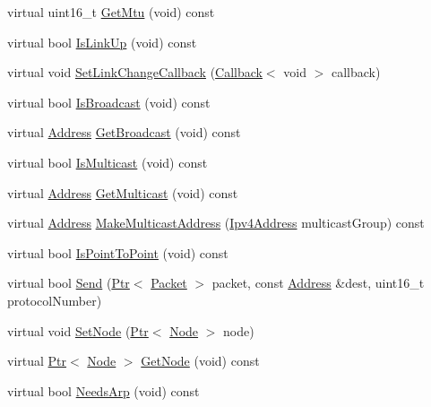 \begin{DoxyCompactItemize}
\item 
virtual uint16\+\_\+t \hyperlink{classns3_1_1WimaxNetDevice_ad847fc199e9517a7d34f5b012bb37cca}{Get\+Mtu} (void) const 
\item 
virtual bool \hyperlink{classns3_1_1WimaxNetDevice_a7d162542e86e757bd41593b82fe189cd}{Is\+Link\+Up} (void) const 
\item 
virtual void \hyperlink{classns3_1_1WimaxNetDevice_a7902e71d1f2c4e8c1f0f86f5bd6730e7}{Set\+Link\+Change\+Callback} (\hyperlink{classns3_1_1Callback}{Callback}$<$ void $>$ callback)
\item 
virtual bool \hyperlink{classns3_1_1WimaxNetDevice_a2719e45018c84b51577e6b17e57d46ad}{Is\+Broadcast} (void) const 
\item 
virtual \hyperlink{classns3_1_1Address}{Address} \hyperlink{classns3_1_1WimaxNetDevice_a2fde0a0f5aaceebdaeb3934331db94aa}{Get\+Broadcast} (void) const 
\item 
virtual bool \hyperlink{classns3_1_1WimaxNetDevice_a5d9dcdbdf2a35d2d6b6f2ac0026f483f}{Is\+Multicast} (void) const 
\item 
virtual \hyperlink{classns3_1_1Address}{Address} \hyperlink{classns3_1_1WimaxNetDevice_a53f5b4f5a107a6ba9c2a7e894c91ae29}{Get\+Multicast} (void) const 
\item 
virtual \hyperlink{classns3_1_1Address}{Address} \hyperlink{classns3_1_1WimaxNetDevice_ab0b97766b7affb0ba0b25e8240e97dbe}{Make\+Multicast\+Address} (\hyperlink{classns3_1_1Ipv4Address}{Ipv4\+Address} multicast\+Group) const 
\item 
virtual bool \hyperlink{classns3_1_1WimaxNetDevice_a919a1d701ab5ef589152bcdef403871b}{Is\+Point\+To\+Point} (void) const 
\item 
virtual bool \hyperlink{classns3_1_1WimaxNetDevice_a6522541de4777fbe16b98a95d14ec588}{Send} (\hyperlink{classns3_1_1Ptr}{Ptr}$<$ \hyperlink{classns3_1_1Packet}{Packet} $>$ packet, const \hyperlink{classns3_1_1Address}{Address} \&dest, uint16\+\_\+t protocol\+Number)
\item 
virtual void \hyperlink{classns3_1_1WimaxNetDevice_ad3761bf051c702ca312e35f7a3ee4838}{Set\+Node} (\hyperlink{classns3_1_1Ptr}{Ptr}$<$ \hyperlink{classns3_1_1Node}{Node} $>$ node)
\item 
virtual \hyperlink{classns3_1_1Ptr}{Ptr}$<$ \hyperlink{classns3_1_1Node}{Node} $>$ \hyperlink{classns3_1_1WimaxNetDevice_aabd723e6e76502d10c90ca7d7f2a4b82}{Get\+Node} (void) const 
\item 
virtual bool \hyperlink{classns3_1_1WimaxNetDevice_a2ea6063418c672ad49614947732e0831}{Needs\+Arp} (void) const 

\end{DoxyCompactItemize}
